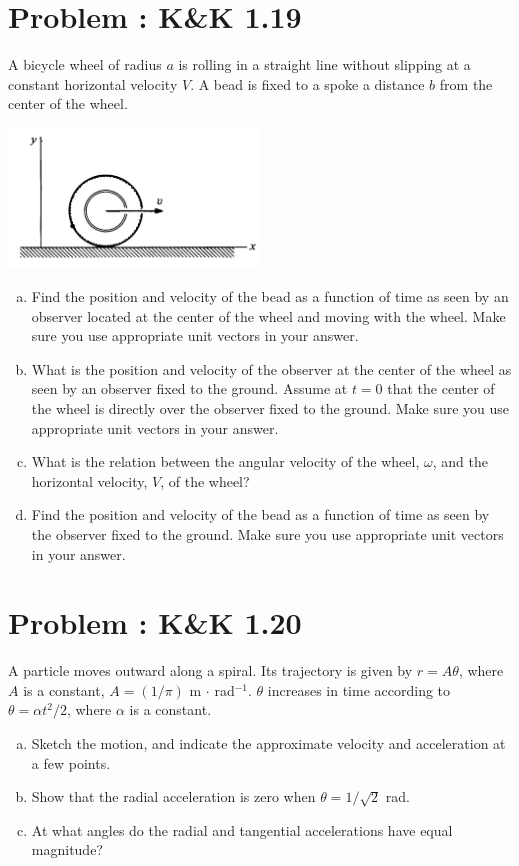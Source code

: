 \documentclass[problems]{esg8012pset}
\begin{document}
\section{Problem \thesection: K\&K 1.19}
  A bicycle wheel of radius $a$ is rolling in a straight line without slipping at a constant horizontal
  velocity $V$. A bead is fixed to a spoke a distance $b$ from the center of the wheel.
  \begin{center}\includegraphics[width=0.5\textwidth]{ps01_3}\end{center}
  \begin{enumerate}[a)]
    \item Find the position and velocity of the bead as a function of time as seen by an observer located
  at the center of the wheel and moving with the wheel. Make sure you use appropriate unit
  vectors in your answer.
    \item What is the position and velocity of the observer at the center of the wheel as seen by an
  observer fixed to the ground. Assume at $t = 0$ that the center of the wheel is directly over the
  observer fixed to the ground. Make sure you use appropriate unit vectors in your answer.
    \item What is the relation between the angular velocity of the wheel, $\omega$, and the horizontal velocity, $V$, of the wheel?
    \item Find the position and velocity of the bead as a function of time as seen by the observer fixed
  to the ground. Make sure you use appropriate unit vectors in your answer.
  \end{enumerate}
\section{Problem \thesection: K\&K 1.20}
  A particle moves outward along a spiral. Its trajectory is given by
  $r = A\theta$, where $A$ is a constant, $A = (1/\pi )$ m $\cdot$ rad$^{-1}$.  $\theta$ increases in time according to $\theta =\alpha t^2 / 2$, where $\alpha$ is a constant.
  \begin{enumerate}[a.]
    \item Sketch the motion, and indicate the approximate velocity and acceleration at a few
  points.
    \item Show that the radial acceleration is zero when $\theta =1/\sqrt{2}$ rad.
    \item At what angles do the radial and tangential accelerations have equal magnitude?
  \end{enumerate}
\end{document}
